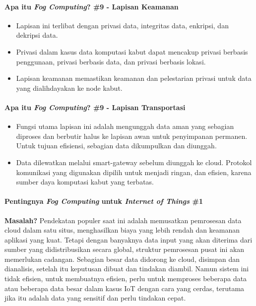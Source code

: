 \begin{frame}{\insertsectionhead}
	\framesubtitle{Apa itu \textit{Fog Computing}? \#9 - Lapisan Keamanan}
	\justifying
	\begin{itemize}
		\item Lapisan ini terlibat dengan privasi data, integritas data, enkripsi, dan dekripsi data.
		\item Privasi dalam kasus data komputasi kabut dapat mencakup privasi berbasis penggunaan, privasi berbasis data, dan privasi berbasis lokasi.
		\item Lapisan keamanan memastikan keamanan dan pelestarian privasi untuk data yang dialihdayakan ke node kabut.
	\end{itemize}
\end{frame}

\begin{frame}{\insertsectionhead}
	\framesubtitle{Apa itu \textit{Fog Computing}? \#9 - Lapisan Transportasi}
	\justifying
	\begin{itemize}
		\item Fungsi utama lapisan ini adalah mengunggah data aman yang sebagian diproses dan berbutir halus ke lapisan awan untuk penyimpanan permanen. Untuk tujuan efisiensi, sebagian data dikumpulkan dan diunggah.
		\item Data dilewatkan melalui smart-gateway sebelum diunggah ke cloud. Protokol komunikasi yang digunakan dipilih untuk menjadi ringan, dan efisien, karena sumber daya komputasi kabut yang terbatas.
	\end{itemize}
\end{frame}

\begin{frame}{\insertsectionhead}
	\framesubtitle{Pentingnya \textit{Fog Computing} untuk \textit{Internet of Things} \#1}
	\justifying
	\textbf{Masalah?}
	\vfill
	Pendekatan populer saat ini adalah memusatkan pemrosesan data cloud dalam satu situs, menghasilkan biaya yang lebih rendah dan keamanan aplikasi yang kuat. Tetapi dengan banyaknya data input yang akan diterima dari sumber yang didistribusikan secara global, struktur pemrosesan pusat ini akan memerlukan cadangan.
	\vfill
	Sebagian besar data didorong ke cloud, disimpan dan dianalisis, setelah itu keputusan dibuat dan tindakan diambil. Namun sistem ini tidak efisien, untuk membuatnya efisien, perlu untuk memproses beberapa data atau beberapa data besar dalam kasus IoT dengan cara yang cerdas, terutama jika itu adalah data yang sensitif dan perlu tindakan cepat.
\end{frame}

